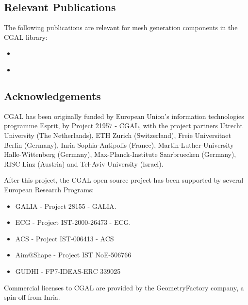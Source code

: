 \subsection{Relevant Publications}
\label{sec:CGAL:publications}

The following publications are relevant for mesh generation components in the CGAL library:


\begin{itemize}
\item \cite{jamin_cgalmesh_2015}
\item \cite{portaneri_alpha_2022}
\end{itemize}


\subsection{Acknowledgements}
\label{sec::CGAL:acknowledgements}

%
%



CGAL has been originally funded by European Union's information technologies programme Esprit, by Project 21957 - CGAL, with the project partners Utrecht University (The Netherlands), ETH Zurich (Switzerland), Freie Universitaet Berlin (Germany), Inria Sophia-Antipolis (France), Martin-Luther-University Halle-Wittenberg (Germany), Max-Planck-Institute Saarbruecken (Germany), RISC Linz (Austria) and Tel-Aviv University (Israel).

After this project, the CGAL open source project has been supported by several European Research Programs:
\begin{itemize}
\item GALIA - Project 28155 - GALIA.
\item ECG -  Project IST-2000-26473 - ECG.
\item ACS - Project IST-006413 - ACS
\item Aim@Shape - Project IST NoE-506766
\item GUDHI - FP7-IDEAS-ERC 339025
\end{itemize}

Commercial licenses to CGAL are provided by the GeometryFactory company, a spin-off from Inria.


